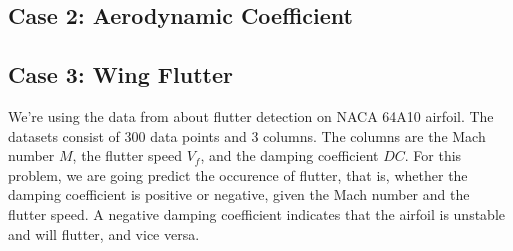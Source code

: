 \documentclass[conf]{new-aiaa}
\begin{document}
\subsection{Case 2: Aerodynamic Coefficient}

\subsection{Case 3: Wing Flutter}
We're using the data from \cite{palar2020gauss} about flutter detection on NACA 64A10 airfoil. The datasets consist of 300 data points and 3 columns. The columns are the Mach number $M$, the flutter speed $V_f$, and the damping coefficient $DC$. For this problem, we are going predict the occurence of flutter, that is, whether the damping coefficient is positive or negative, given the Mach number and the flutter speed. A negative damping coefficient indicates that the airfoil is unstable and will flutter, and vice versa.
\end{document}
